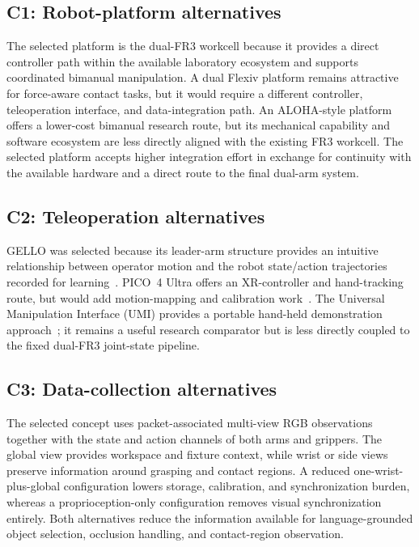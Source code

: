 \subsection*{C1: Robot-platform alternatives}

The selected platform is the dual-FR3 workcell because it provides a direct controller path within the available laboratory ecosystem and supports coordinated bimanual manipulation. A dual Flexiv platform remains attractive for force-aware contact tasks, but it would require a different controller, teleoperation interface, and data-integration path. An ALOHA-style platform offers a lower-cost bimanual research route, but its mechanical capability and software ecosystem are less directly aligned with the existing FR3 workcell. The selected platform accepts higher integration effort in exchange for continuity with the available hardware and a direct route to the final dual-arm system.

\subsection*{C2: Teleoperation alternatives}

GELLO was selected because its leader-arm structure provides an intuitive relationship between operator motion and the robot state/action trajectories recorded for learning~\cite{gello}. PICO~4 Ultra offers an XR-controller and hand-tracking route, but would add motion-mapping and calibration work~\cite{pico4ultra}. The Universal Manipulation Interface (UMI) provides a portable hand-held demonstration approach~\cite{umi}; it remains a useful research comparator but is less directly coupled to the fixed dual-FR3 joint-state pipeline.

\subsection*{C3: Data-collection alternatives}

The selected concept uses packet-associated multi-view RGB observations together with the state and action channels of both arms and grippers. The global view provides workspace and fixture context, while wrist or side views preserve information around grasping and contact regions. A reduced one-wrist-plus-global configuration lowers storage, calibration, and synchronization burden, whereas a proprioception-only configuration removes visual synchronization entirely. Both alternatives reduce the information available for language-grounded object selection, occlusion handling, and contact-region observation.

